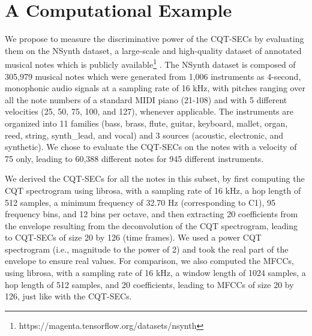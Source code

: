 \documentclass[journal]{IEEEtran}
\begin{document}
\section{A Computational Example}

We propose to measure the discriminative power of the CQT-SECs by evaluating them on the NSynth dataset, a large-scale and high-quality dataset of annotated musical notes which is publicly available\footnote{https://magenta.tensorflow.org/datasets/nsynth} \cite{engel2017}. The NSynth dataset is composed of 305,979 musical notes which were generated from 1,006 instruments as 4-second, monophonic audio signals at a sampling rate of 16 kHz, with pitches ranging over all the note numbers of a standard MIDI piano (21-108) and with 5 different velocities (25, 50, 75, 100, and 127), whenever applicable. The instruments are organized into 11 families (bass, brass, flute, guitar, keyboard, mallet, organ, reed, string, synth\_lead, and vocal) and 3 sources (acoustic, electronic, and synthetic). We chose to evaluate the CQT-SECs on the notes with a velocity of 75 only, leading to 60,388 different notes for 945 different instruments.

We derived the CQT-SECs for all the notes in this subset, by first computing the CQT spectrogram using librosa, with a sampling rate of 16 kHz, a hop length of 512 samples, a minimum frequency of 32.70 Hz (corresponding to C1), 95 frequency bins, and 12 bins per octave, and then extracting 20 coefficients from the envelope resulting from the deconvolution of the CQT spectrogram, leading to CQT-SECs of size 20 by 126 (time frames). We used a power CQT spectrogram (i.e., magnitude to the power of 2) and took the real part of the envelope to ensure real values. For comparison, we also computed the MFCCs, using librosa, with a sampling rate of 16 kHz, a window length of 1024 samples, a hop length of 512 samples, and 20 coefficients, leading to MFCCs of size 20 by 126, just like with the CQT-SECs.
\end{document}
